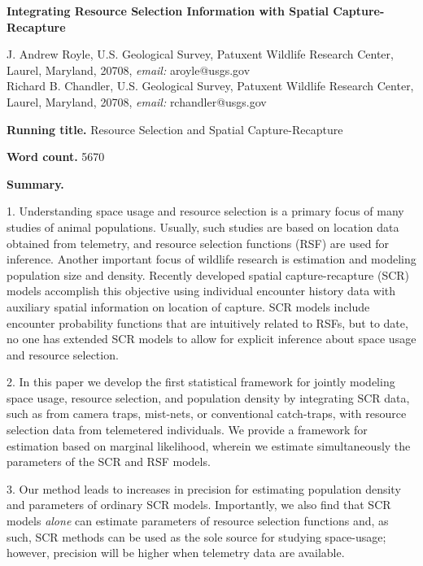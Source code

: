 \documentclass[12pt]{article}
\begin{document}
\begin{center}
\Large \textbf{
Integrating
Resource Selection Information with Spatial Capture-Recapture
}
\end{center}
%


\noindent J. Andrew Royle, U.S. Geological Survey, Patuxent
Wildlife Research Center, Laurel, Maryland, 20708,
\emph{email:} aroyle@usgs.gov \\

\noindent Richard B. Chandler,  U.S. Geological Survey, Patuxent
Wildlife Research Center, Laurel, Maryland, 20708,
\emph{email:} rchandler@usgs.gov \\

\vspace{.2in}

{\bf Running title.} Resource Selection and Spatial Capture-Recapture

\vspace{.2in}

{\bf Word count.} 5670

\vspace{.2in}

{\bf Summary.}

1.
Understanding space usage and resource selection is a primary focus of
many studies of animal populations. Usually, such studies are based on
location data obtained from telemetry,
and resource selection functions (RSF) are used for inference.
Another important focus of wildlife research is estimation and
modeling population size and density.
Recently developed spatial capture-recapture (SCR) models accomplish this objective
using individual encounter history data with auxiliary spatial information
on location of capture. SCR models include %
encounter probability functions that %
are intuitively related to RSFs, but %
to date, no one has extended
SCR models to allow for explicit inference about
space usage and resource selection.

2. In this paper we develop the first statistical framework for
jointly modeling space usage, resource selection, and population
density by integrating SCR data, such as from camera traps, mist-nets, or
conventional catch-traps, with resource selection data from telemetered individuals.
We provide a framework for estimation based on marginal
likelihood, wherein we estimate simultaneously the parameters of the
SCR and RSF models.

3.
Our method leads to increases in precision
for estimating %
population density and parameters of ordinary
SCR models.  Importantly, we also find that SCR models {\it alone} can
estimate parameters of resource selection functions and, as such, SCR
methods can be used as the sole source for studying space-usage;
however, precision will be higher when telemetry data are available.
\end{document}
